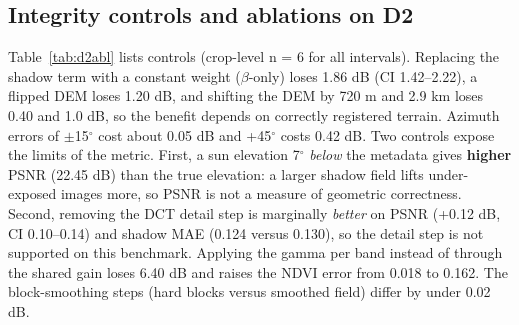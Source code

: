 \documentclass[conference]{IEEEtran}
\begin{document}
\subsection{Integrity controls and ablations on D2}
Table~\ref{tab:d2abl} lists controls (crop-level n = 6 for all intervals). Replacing the shadow term with a constant weight ($\beta$-only) loses 1.86 dB (CI 1.42--2.22), a flipped DEM loses 1.20 dB, and shifting the DEM by 720 m and 2.9 km loses 0.40 and 1.0 dB, so the benefit depends on correctly registered terrain. Azimuth errors of $\pm$15$^{\circ}$ cost about 0.05 dB and +45$^{\circ}$ costs 0.42 dB. Two controls expose the limits of the metric. First, a sun elevation 7$^{\circ}$ \emph{below} the metadata gives \textbf{higher} PSNR (22.45 dB) than the true elevation: a larger shadow field lifts under-exposed images more, so PSNR is not a measure of geometric correctness. Second, removing the DCT detail step is marginally \emph{better} on PSNR (+0.12 dB, CI 0.10--0.14) and shadow MAE (0.124 versus 0.130), so the detail step is not supported on this benchmark. Applying the gamma per band instead of through the shared gain loses 6.40 dB and raises the NDVI error from 0.018 to 0.162. The block-smoothing steps (hard blocks versus smoothed field) differ by under 0.02 dB.

\begin{table}[t]
\caption{D2 controls and ablations (means over 60 pairs; the table reports pair-level means, intervals are in \texttt{tables/d2\_vs\_tascv0.csv}).}
\label{tab:d2abl}
\centering\scriptsize
\setlength{\tabcolsep}{2.5pt}
\end{table}
\end{document}
